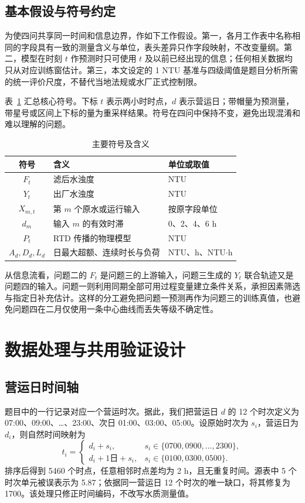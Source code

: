 \documentclass[UTF8,12pt,a4paper]{ctexart}
\begin{document}
\subsection{基本假设与符号约定}
为使四问共享同一时间和信息边界，作如下工作假设。第一，各月工作表中名称相同的字段具有一致的测量含义与单位，表头差异只作字段映射，不改变量纲。第二，模型在时刻 $t$ 作预测时只可使用 $t$ 及以前已经出现的信息；任何相关数据均只从对应训练窗估计。第三，本文设定的 1 NTU 基准与四级阈值是题目分析所需的统一评价尺度，不替代当地法规或水厂正式控制限。

表~\ref{tab:symbols} 汇总核心符号。下标 $t$ 表示两小时时点，$d$ 表示营运日；带帽量为预测量，带星号或区间上下标的量为重采样结果。符号在四问中保持不变，避免出现混淆和难以理解的问题。

\begin{table}[htbp]
\centering
\caption{主要符号及含义}
\label{tab:symbols}
\begin{tabular}{cll}
\toprule
符号 & 含义 & 单位或取值\\
\midrule
$F_t$ & 滤后水浊度 & NTU\\
$Y_t$ & 出厂水浊度 & NTU\\
$X_{m,t}$ & 第 $m$ 个原水或运行输入 & 按原字段单位\\
$d_m$ & 输入 $m$ 的有效时滞 & 0、2、4、6 h\\
$P_t$ & RTD 传播的物理模型 & NTU\\
$A_d,D_d,L_d$ & 日最大超额、连续时长与负荷 & NTU、h、NTU$\cdot$h\\
\bottomrule
\end{tabular}
\end{table}

从信息流看，问题二的 $F_t$ 是问题三的上游输入，问题三生成的 $Y_t$ 联合轨迹又是问题四的输入。问题一则利用同期全部可用过程变量建立条件关系，承担因素筛选与指定日补充估计。这样的分工避免把问题一预测再作为问题三的训练真值，也避免问题四在二月仅使用一条中心曲线而丢失等级不确定性。

\section{数据处理与共用验证设计}

\subsection{营运日时间轴}

题目中的一行记录对应一个营运时次。据此，我们把营运日 $d$ 的 12 个时次定义为 07:00、09:00、\ldots、23:00、次日 01:00、03:00、05:00。设原始时次为 $s_i$，营运日为 $d_i$，则自然时间映射为
\begin{equation}
t_i=\begin{cases}
d_i+s_i, & s_i\in\{0700,0900,\ldots,2300\},\\
d_i+1\text{日}+s_i, & s_i\in\{0100,0300,0500\}.
\end{cases}
\label{eq:timeline}
\end{equation}
排序后得到 5460 个时点，任意相邻时点差均为 2 h，且无重复时间。源表中 5 个时次单元被误表示为 5.87；依据同一营运日 12 个时次的唯一缺口，将其修复为 1700。该处理只修正时间编码，不改写水质测量值。
\end{document}
